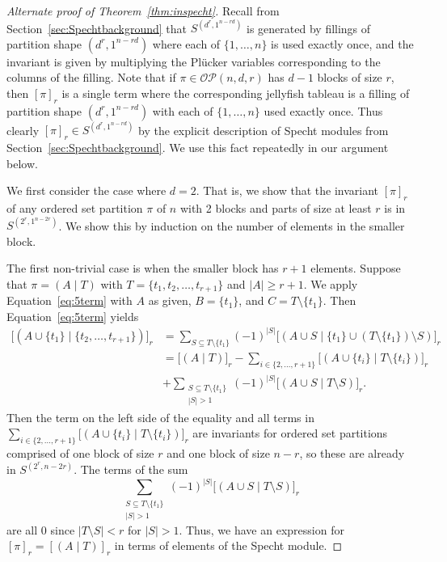 \documentclass[ALCO, Unicode]{cedram}
\numberwithin{equation}{section}
\newcommand{\ordsetpart}{\mathcal{OP}}
\begin{document}
\begin{proof}[Alternate proof of Theorem~\ref{thm:inspecht}]
Recall from Section~\ref{sec:Spechtbackground} that $S^{(d^r,1^{n- rd})}$ is generated by fillings of partition shape $(d^r,1^{n-r d})$ where each of $\{1,\ldots,n\}$ is used exactly once, and the invariant is given by multiplying the Pl\"ucker variables corresponding to the columns of the filling. Note that if $ \pi \in \ordsetpart(n,d,r)$ has $d-1$ blocks of size $r$, then $[\pi]_r$ is a single term where the corresponding jellyfish tableau is a filling of partition shape $(d^r,1^{n-r d})$ with each of $\{1,\ldots,n\}$ used exactly once. Thus clearly $[\pi]_r\in S^{(d^r,1^{n-r d})}$ by the explicit description of Specht modules from Section~\ref{sec:Spechtbackground}. We use this fact repeatedly in our argument below.

We first consider the case where $d=2$. That is, we show that the invariant $[\pi]_r$ of any ordered set partition $\pi$ of $n$ with 2 blocks and parts of size at least $r$ is in $S^{(2^r,1^{n-2r})}$. We show this by induction on the number of elements in the smaller block.

The first non-trivial case is when the smaller block has $r+1$ elements. Suppose that $\pi=(A \mid T)$ with $T=\{t_1,t_2,\ldots,t_{r+1}\}$ and $|A|\geq r+1$. We apply Equation~\eqref{eq:5term} with $A$ as given, $B=\{t_1\}$, and $C=T\setminus \{t_1\}$. Then Equation~\eqref{eq:5term} yields
\begin{align*}
\big[(A\cup \{t_1\} \mid \{t_2,\ldots,t_{r+1}\})\big]_r&=\sum_{S\subseteq T\setminus \{t_1\}}(-1)^{|S|}\big[(A\cup S \mid \{t_1\}\cup (T\setminus \{t_1\})\setminus S)\big]_r\\
&=\big[(A \mid T)\big]_r-\sum_{i\in\{2,\ldots,r+1\}}\big[(A\cup \{t_i\} \mid T\setminus \{t_i\})\big]_r\\
&+\sum_{\substack{S\subseteq T\setminus \{t_1\} \\ |S|>1}}(-1)^{|S|}\big[(A\cup S \mid T\setminus S)\big]_r.
\end{align*}
Then the term on the left side of the equality and all terms in $\sum_{i\in\{2,\ldots,r+1\}}\big[(A\cup \{t_i\} \mid T\setminus \{t_i\})\big]_r$ are invariants for ordered set partitions comprised of one block of size $r$ and one block of size $n-r$, so these are already in $S^{(2^r, n-2r)}$. The terms of the sum 
\[\sum_{\substack{S\subseteq T\setminus \{t_1\} \\ |S|>1}}(-1)^{|S|}\big[(A\cup S \mid T\setminus S)\big]_r
\]
are all $0$ since $|T\setminus S|<r$ for $|S|>1$. Thus, we have an expression for $[\pi]_r=[(A \mid T)]_r$ in terms of elements of the Specht module. 


\end{proof}
\end{document}
